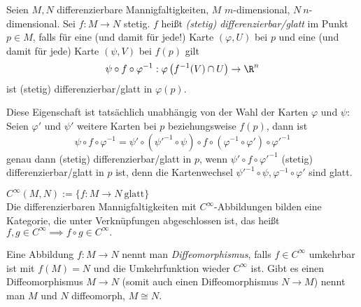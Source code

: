 \addtocounter{thm}{1}\lecture
\begin{defn}
	Seien $M,N$ differenzierbare Mannigfaltigkeiten, $M$ $m$-dimensional, $N\ n$-dimensional. Sei $ f: M \to N $  stetig. $f$ heißt \emph{(stetig) differenzierbar/glatt} im Punkt $p \in M$, falls für eine (und damit für jede!) Karte $ (\varphi,U) $ bei $p$ und eine (und damit für jede) Karte $ (\psi,V) $ bei $f(p)$ gilt
	\[ \psi \circ f \circ \varphi^{-1}: \varphi \left( f^{-1}(V) \cap U \right) \to \R^n \]
	ist (stetig) differenzierbar/glatt in $\varphi(p).$
\end{defn}

Diese Eigenschaft ist tatsächlich unabhängig von der Wahl der Karten $\varphi$ und $\psi$: Seien $ \varphi' $ und $\psi'$ weitere Karten bei $p$ beziehungsweise $f(p)$, dann ist 
\[ \psi \circ f \circ \varphi^{-1} = \psi' \circ \left( \psi'^{-1} \circ \psi \right) \circ f \circ \left( \varphi^{-1} \circ \varphi' \right) \circ \varphi'^{-1} \]
genau dann (stetig) differenzierbar/glatt in $p$, wenn $\psi' \circ f \circ \varphi'^{-1}$ (stetig) differenzierbar/glatt in $p$ ist, denn die Kartenwechsel $\psi'^{-1} \circ \psi, \varphi^{-1} \circ \varphi'$ sind glatt.

\begin{rem*}
	$ C^\infty (M,N) := \{ f: M \to N \ \text{glatt}\} $\\
	Die differenzierbaren Mannigfaltigkeiten mit $C^\infty$-Abbildungen bilden eine Kategorie, die unter Verknüpfungen abgeschlossen ist, das heißt $ f, g \in C^\infty \implies f \circ g \in C^\infty. $
\end{rem*}

\begin{defn}[Diffeomorphismus]
	Eine Abbildung $ f: M \to N $ nennt man \emph{Diffeomorphismus}, falls $ f \in C^\infty $ umkehrbar ist mit $ f(M)=N $ und die Umkehrfunktion wieder $C^\infty$ ist. Gibt es einen Diffeomorphismus $ M \to N $ (somit auch einen Diffeomorphismus $N \to M$) nennt man $M$ und $N$ diffeomorph, $M \cong N$.
\end{defn}

